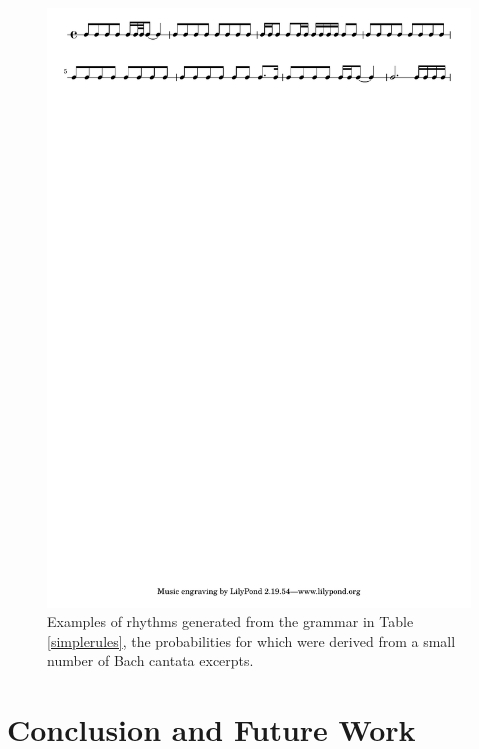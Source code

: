 \documentclass{article}
\begin{document}
\begin{figure}[t] %
\centering
\includegraphics[width=16cm]{bach_output.pdf}
\caption{Examples of rhythms generated from the grammar in Table \ref{simplerules}, the probabilities for which were derived from a small number of Bach cantata excerpts.}\label{learninggen}
\end{figure}



\section{Conclusion and Future Work} 
\end{document}
